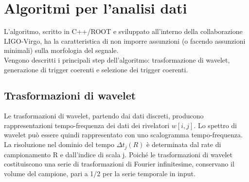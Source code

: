 \section{Algoritmi per l'analisi dati}
L'algoritmo, scritto in C++/ROOT e sviluppato all'interno della collaborazione LIGO-Virgo, ha la caratteristica di non imporre assunzioni (o facendo assunzioni minimali) sulla morfologia del segnale.\\
Vengono descritti i principali step dell'algoritmo: trasformazione di wavelet, generazione di trigger coerenti e selezione dei trigger coerenti.
\subsection{Trasformazioni di wavelet}
\label{subsection:wavelet_transform}
Le trasformazioni di wavelet, partendo dai dati discreti, producono rappresentazioni tempo-frequenza dei dati dei rivelatori $w[i,j]$. Lo spettro di wavelet può essere quindi rappresentato con uno scalogramma tempo-frequenza. La risoluzione nel dominio del tempo $\Delta t_j(R)$ è determinata dal rate di campionamento R e dall'indice di scala j. Poiché le trasformazioni di wavelet costituiscono una serie di trasformazioni di Fourier infinitesime, conservano il volume del campione, pari a 1/2 per la serie temporale in input.


